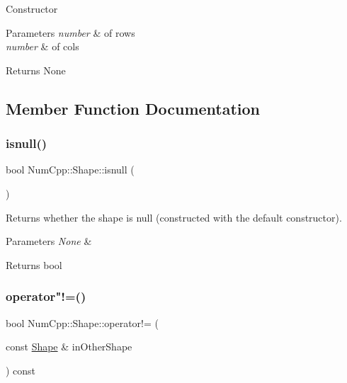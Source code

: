 Constructor


\begin{DoxyParams}{Parameters}
{\em number} & of rows \\
\hline
{\em number} & of cols\\
\hline
\end{DoxyParams}
\begin{DoxyReturn}{Returns}
None 
\end{DoxyReturn}


\subsection{Member Function Documentation}
\mbox{\label{class_num_cpp_1_1_shape_a88d385a8c0651a666413543dde4a176f}} 
\subsubsection{\texorpdfstring{isnull()}{isnull()}}
{\footnotesize\ttfamily bool Num\+Cpp\+::\+Shape\+::isnull (\begin{DoxyParamCaption}{ }\end{DoxyParamCaption})\hspace{0.3cm}{\ttfamily [inline]}}

Returns whether the shape is null (constructed with the default constructor).


\begin{DoxyParams}{Parameters}
{\em None} & \\
\hline
\end{DoxyParams}
\begin{DoxyReturn}{Returns}
bool 
\end{DoxyReturn}
\mbox{\label{class_num_cpp_1_1_shape_ad7df56e67409d2a3e859ae25dce960f7}} 
\subsubsection{\texorpdfstring{operator"!=()}{operator!=()}}
{\footnotesize\ttfamily bool Num\+Cpp\+::\+Shape\+::operator!= (\begin{DoxyParamCaption}\item[{const \mbox{\hyperlink{class_num_cpp_1_1_shape}{Shape}} \&}]{in\+Other\+Shape }\end{DoxyParamCaption}) const\hspace{0.3cm}{\ttfamily [inline]}}

